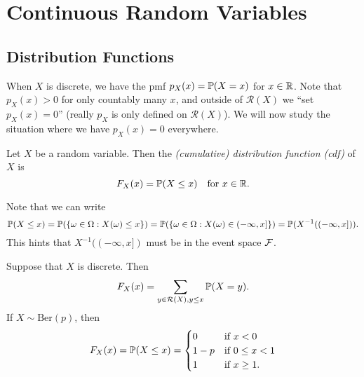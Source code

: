 \chapter{Continuous Random Variables}

\section{Distribution Functions}
\begin{remark}
  When $X$ is discrete, we have the pmf
  $p_X(x) = \mathbb{P}(X = x)$ for $x \in \mathbb{R}$. Note that
  $p_X(x) > 0$ for only countably many $x$, and
  outside of $\mathcal{R}(X)$ we ``set $p_X(x) = 0$''
  (really $p_X$ is only defined on $\mathcal{R}(X)$).
  We will now study the situation where we
  have $p_X(x) = 0$ everywhere.
\end{remark}

\begin{definition}
  Let $X$ be a random variable. Then the
  \emph{(cumulative) distribution function (cdf)}
  of $X$ is
  \[
    F_X(x) = \mathbb{P}(X \le x) \quad \text{for } x \in \mathbb{R}.
  \]
\end{definition}

\begin{remark}
  Note that we can write
  \[
    \mathbb{P}(X \le x)
    = \mathbb{P}(\{\omega \in \Omega : X(\omega) \le x\})
    = \mathbb{P}(\{\omega \in \Omega : X(\omega) \in (-\infty, x]\})
    = \mathbb{P}(X^{-1}((-\infty, x])).
  \]
  This hints that $X^{-1}((-\infty, x])$ must be in
  the event space $\mathcal{F}$.
\end{remark}

\begin{example}
  Suppose that $X$ is discrete. Then
  \[
    F_X(x) = \sum_{y \in \mathcal{R}(X), y \le x} \mathbb{P}(X = y).
  \]
  If $X \sim \mathrm{Ber}(p)$, then
  \[
    F_X(x) = \mathbb{P}(X \le x) =
    \begin{cases}
      0 & \text{if $x < 0$} \\
      1 - p & \text{if $0 \le x < 1$} \\
      1 & \text{if $x \ge 1$}.
    \end{cases}
  \]
\end{example}

